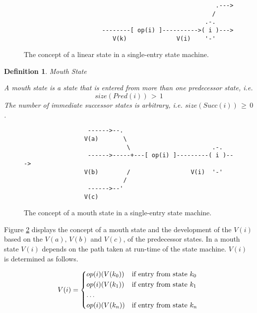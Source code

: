 \documentclass[12pt,a4paper]{scrartcl}
\newtheorem{definition}{Definition}
\begin{document}
\begin{figure}[htbp] \leavevmode \label{fig:linear-state}
\begin{verbatim}
                                                      .---> 
                                                     /
                                                   .-.
                      --------[ op(i) ]---------->( i )---> 
                         V(k)              V(i)    '-'

\end{verbatim}
\caption{The concept of a linear state in a single-entry state machine.}
\end{figure}

\begin{definition}
Mouth State

A mouth state is a state that is entered from more than one predecessor 
state, i.e.
\begin{equation}
                           size(Pred(i))\,>\,1
\end{equation}
The number of immediate successor states is arbitrary, i.e.
$size(Succ(i))\,\ge\,0$.

\end{definition}
    
\begin{figure}[htbp] \leavevmode \label{fig:mouth-state}
\begin{verbatim}
                  ------>--.  
                 V(a)       \ 
                             \                       .-.
                  ------>-----+---[ op(i) ]---------( i )---> 
                 V(b)        /                 V(i)  '-'
                            /
                  ------>--'
                 V(c)

\end{verbatim}
\caption{The concept of a mouth state in a single-entry state machine.}
\end{figure}

Figure \ref{fig:mouth-state} displays the concept of a mouth state and the
development of the $V(i)$ based on the $V(a),\,V(b)$ and $V(c)$, of the
predecessor states. In a mouth state $V(i)$ depends on the path taken at
run-time of the state machine.  $V(i)$ is determined as follows.

\begin{equation} \label{eq:interference}
    V(i) = \begin{dcases*}
            op(i)(V(k_0)) & if entry from state $k_0$ \\
            op(i)(V(k_1)) & if entry from state $k_1$ \\
            \ldots \\
            op(i)(V(k_n)) & if entry from state $k_n$ \\
            \end{dcases*}
\end{equation}
\end{document}
